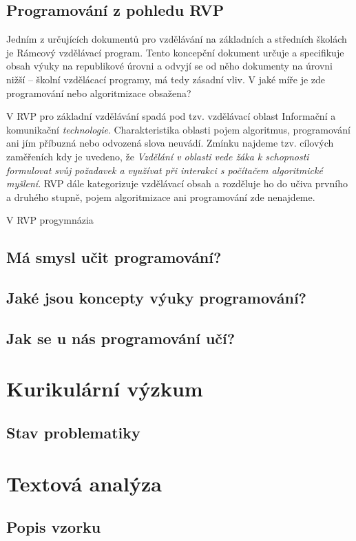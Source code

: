 \documentclass[FP,DP]{tulthesis}
\begin{document}
\section{Programování z pohledu RVP}
Jedním z určujících dokumentů pro vzdělávání na základních a středních školách je Rámcový vzdělávací program. Tento koncepční dokument určuje a specifikuje obsah výuky na republikové úrovni a odvyjí se od něho dokumenty na úrovni nižší -- školní vzdělácací programy, má tedy zásadní vliv. V jaké míře je zde programování nebo algoritmizace obsažena?
 
V RVP pro základní vzdělávání \citep{rvpzv} spadá pod tzv. vzdělávací oblast Informační a komunikační \textit{technologie}. Charakteristika oblasti pojem algoritmus, programování ani jím příbuzná nebo odvozená slova neuvádí. Zmínku najdeme tzv. cílových zaměřeních kdy je uvedeno, že \textit{Vzdělání v oblasti vede žáka k schopnosti formulovat svůj požadavek a využívat při interakci s počítačem algoritmické myšlení}. RVP dále kategorizuje vzdělávací obsah a rozděluje ho do učiva prvního a druhého stupně, pojem algoritmizace ani programování zde nenajdeme. 

V RVP progymnázia\citep{rvpgy}




\section{Má smysl učit programování?}
\section{Jaké jsou koncepty výuky programování?}
\section{Jak se u nás programování učí?}
\chapter{Kurikulární výzkum}
\section{Stav problematiky}
\chapter{Textová analýza}
\section{Popis vzorku}
\end{document}
